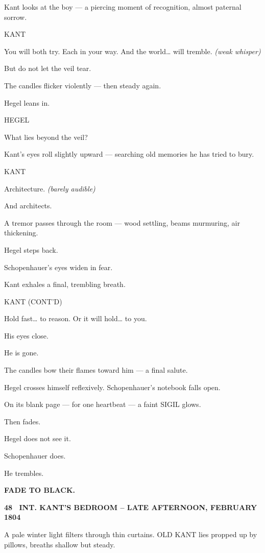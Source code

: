 \documentclass[12pt]{article}
\newcommand{\scene}[2]{%
  \vspace{1.8\baselineskip}%
  \noindent\textbf{#1 \ #2}\par\vspace{0.4\baselineskip}%
}
\newenvironment{dialogue}[1]{%
  \vspace{0.8\baselineskip}%
  \noindent\hspace*{2.3in}\textsc{#1}\par%
  \noindent\hspace*{1.5in}\begin{minipage}[t]{4.5in}%
}{%
  \end{minipage}\par%
}
\newcommand{\paren}[1]{%
  \noindent\hspace*{1.8in}\textit{(#1)}\par%
}
\newcommand{\transition}[1]{%
  \vspace{0.6\baselineskip}%
  \begin{flushright}\textbf{#1}\end{flushright}%
}
\begin{document}
Kant looks at the boy —
a piercing moment of recognition, almost paternal sorrow.

\begin{dialogue}{KANT}
You will both try.
Each in your way.
And the world…
will tremble.
\paren{weak whisper}
But do not let the veil tear.
\end{dialogue}

The candles flicker violently —
then steady again.

Hegel leans in.

\begin{dialogue}{HEGEL}
What lies beyond the veil?
\end{dialogue}

Kant’s eyes roll slightly upward — searching old memories he has tried to bury.

\begin{dialogue}{KANT}
Architecture.
\paren{barely audible}
And architects.
\end{dialogue}

A tremor passes through the room —
wood settling, beams murmuring, air thickening.

Hegel steps back.

Schopenhauer’s eyes widen in fear.

Kant exhales a final, trembling breath.

\begin{dialogue}{KANT (CONT'D)}
Hold fast…
to reason.
Or it will hold…
to you.
\end{dialogue}

His eyes close.

He is gone.

The candles bow their flames toward him —
a final salute.

Hegel crosses himself reflexively.
Schopenhauer’s notebook falls open.

On its blank page —
for one heartbeat —
a faint SIGIL glows.

Then fades.

Hegel does not see it.

Schopenhauer does.

He trembles.

\transition{FADE TO BLACK.}

\scene{48}{INT. KANT'S BEDROOM -- LATE AFTERNOON, FEBRUARY 1804}

A pale winter light filters through thin curtains.
OLD KANT lies propped up by pillows, breaths shallow but steady.
\end{document}
